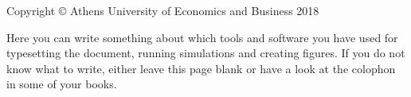 \thispagestyle{empty}
{\small
\strut\vfill %
\noindent Copyright \copyright{} Athens University of Economics and Business 2018\par
\vspace{0.2cm}
\noindent Here you can write something about which tools and software you have used for typesetting the document, running simulations and creating figures. If you do not know what to write, either leave this page blank or have a look at the colophon in some of your books.
}
\clearpage
